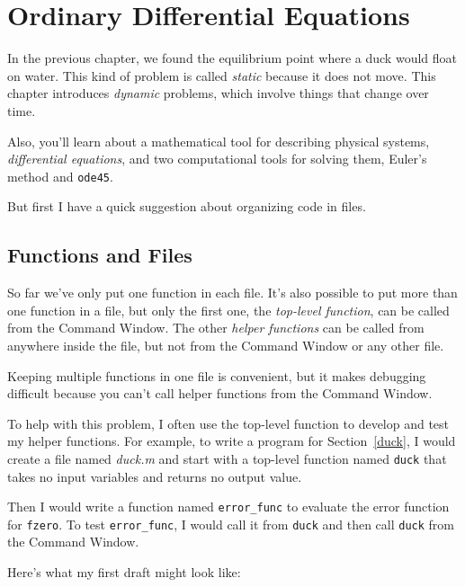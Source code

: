 \chapter{Ordinary Differential Equations}


In the previous chapter, we found the equilibrium point where a duck would float on water.  This kind of problem is called \emph{static} because it does not move.  This chapter introduces \emph{dynamic} problems, which involve things that change over time.

Also, you'll learn about a mathematical tool for describing physical systems, \emph{differential equations}, and two computational tools for solving them, Euler's method and \lstinline{ode45}.

But first I have a quick suggestion about organizing code in files.

\section{Functions and Files}
\label{funfiles}

So far we've only put one function in each file.  It's also possible
to put more than one function in a file, but only the first one, the
\emph{top-level function}, can be called from the Command
Window.  The other \emph{helper functions} can be called from anywhere inside the file, but not from the Command Window or any other file.


Keeping multiple functions in one file is convenient, but it makes  debugging
difficult because you can't call helper functions from the Command
Window.

To help with this problem, I often use the top-level function
to develop and test my helper functions.  For example, to write
a program for Section~\ref{duck}, I would create a file named
\emph{duck.m} and start with a top-level function named \lstinline{duck}
that takes no input variables and returns no output value.

Then I would write a function named \lstinline{error_func} to
evaluate the error function for \lstinline{fzero}.  To test
\lstinline{error_func}, I would call it from \lstinline{duck} and then
call \lstinline{duck} from the Command Window.


Here's what my first draft might look like:


